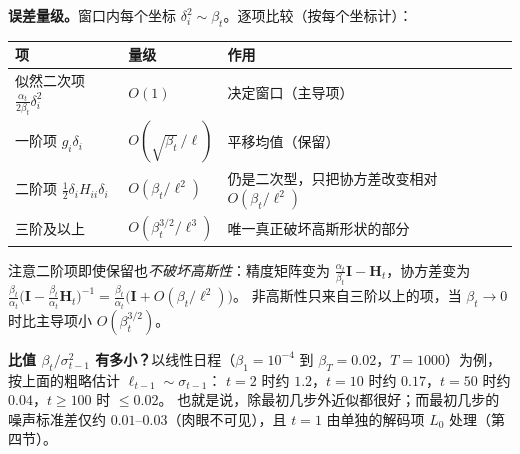 \documentclass[a4paper,fontset=none,zihao=5]{ctexart}
\numberwithin{equation}{section}
\newcommand{\I}{\mathbf{I}}
\begin{document}
\textbf{误差量级。}窗口内每个坐标 $\delta_i^2\sim\beta_t$。逐项比较（按每个坐标计）：
\begin{center}
\small
\begin{tabular}{lll}
  \toprule
  项 & 量级 & 作用 \\
  \midrule
  似然二次项 $\frac{\alpha_t}{2\beta_t}\delta_i^2$ & $O(1)$ & 决定窗口（主导项） \\
  一阶项 $g_i\delta_i$ & $O(\sqrt{\beta_t}\,/\ell)$ & 平移均值（保留） \\
  二阶项 $\frac12\delta_iH_{ii}\delta_i$ & $O(\beta_t/\ell^2)$ & 仍是二次型，只把协方差改变相对 $O(\beta_t/\ell^2)$ \\
  三阶及以上 & $O(\beta_t^{3/2}/\ell^3)$ & 唯一真正破坏高斯形状的部分 \\
  \bottomrule
\end{tabular}
\end{center}
注意二阶项即使保留也\emph{不破坏高斯性}：精度矩阵变为 $\frac{\alpha_t}{\beta_t}\I-\mathbf{H}_t$，协方差变为
$\frac{\beta_t}{\alpha_t}\big(\I-\frac{\beta_t}{\alpha_t}\mathbf{H}_t\big)^{-1}=\frac{\beta_t}{\alpha_t}\big(\I+O(\beta_t/\ell^2)\big)$。
非高斯性只来自三阶以上的项，当 $\beta_t\to0$ 时比主导项小 $O(\beta_t^{3/2})$。

\begin{notebox}
\textbf{比值 $\beta_t/\sigma_{t-1}^2$ 有多小？}以线性日程（$\beta_1=10^{-4}$ 到 $\beta_T=0.02$，$T=1000$）为例，按上面的粗略估计 $\ell_{t-1}\sim\sigma_{t-1}$：
$t=2$ 时约 $1.2$，$t=10$ 时约 $0.17$，$t=50$ 时约 $0.04$，$t\ge 100$ 时 $\le 0.02$。
也就是说，除最初几步外近似都很好；而最初几步的噪声标准差仅约 $0.01$–$0.03$（肉眼不可见），且 $t=1$ 由单独的解码项 $L_0$ 处理（第四节）。
\end{notebox}
\end{document}
